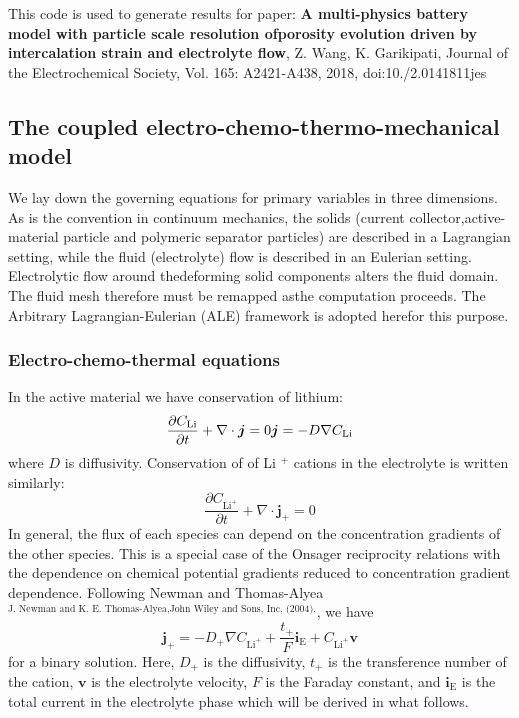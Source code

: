 This code is used to generate results for paper\+: {\bfseries{A multi-\/physics battery model with particle scale resolution ofporosity evolution driven by intercalation strain and electrolyte flow}}, Z. Wang, K. Garikipati, Journal of the Electrochemical Society, Vol. 165\+: A2421-\/\+A438, 2018, doi\+:10./2.0141811jes  \hypertarget{battery_particle_section1}{}\subsection{The coupled electro-\/chemo-\/thermo-\/mechanical model}\label{battery_particle_section1}
We lay down the governing equations for primary variables in three dimensions. As is the convention in continuum mechanics, the solids (current collector,active-\/material particle and polymeric separator particles) are described in a Lagrangian setting, while the fluid (electrolyte) flow is described in an Eulerian setting. Electrolytic flow around thedeforming solid components alters the fluid domain. The fluid mesh therefore must be remapped asthe computation proceeds. The Arbitrary Lagrangian-\/\+Eulerian (A\+LE) framework is adopted herefor this purpose. \hypertarget{battery_particle_subsub1}{}\subsubsection{Electro-\/chemo-\/thermal equations}\label{battery_particle_subsub1}
In the active material we have conservation of lithium\+: \[ \frac{\partial C_\text{Li}}{\partial t}+\nabla\cdot\boldsymbol{j}=0\\ \boldsymbol{j}=-D\nabla C_\text{Li} \] where $D$ is diffusivity. Conservation of of Li $^+$ cations in the electrolyte is written similarly\+: \[ \frac{\partial C_{\text{Li}^+}}{\partial t}+\nabla\cdot\boldsymbol{j}_+=0 \] In general, the flux of each species can depend on the concentration gradients of the other species. This is a special case of the Onsager reciprocity relations with the dependence on chemical potential gradients reduced to concentration gradient dependence. Following Newman and Thomas-\/\+Alyea $^{\text{J. Newman and K. E. Thomas-Alyea,John Wiley and Sons, Inc, (2004).}}$, we have \[ \boldsymbol{j}_+=-D_{+}\nabla C_{\text{Li}^+} +\frac{t_+}{F}\boldsymbol{i}_\text{E}+C_{\text{Li}^+}\boldsymbol{v} \] for a binary solution. Here, $D_{+}$ is the diffusivity, $t_+$ is the transference number of the cation, $\boldsymbol{v}$ is the electrolyte velocity, $F$ is the Faraday constant, and $\boldsymbol{i}_\text{E}$ is the total current in the electrolyte phase which will be derived in what follows.


